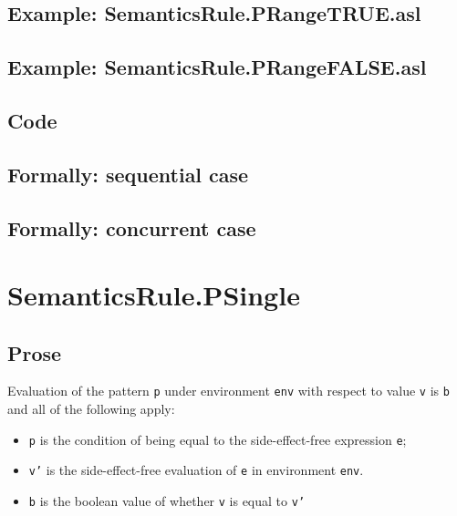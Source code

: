\documentclass{book}
\begin{document}
    \subsection{Example: SemanticsRule.PRangeTRUE.asl}

    \subsection{Example: SemanticsRule.PRangeFALSE.asl}

  \subsection{Code}

\begin{emptyformal}
  \subsection{Formally: sequential case}

  \subsection{Formally: concurrent case}
\end{emptyformal}


\section{SemanticsRule.PSingle \label{sec:SemanticsRule.PSingle}}

    \subsection{Prose}
  Evaluation of the pattern \texttt{p} under environment \texttt{env} with
  respect to value \texttt{v} is \texttt{b} and all of the following apply:
    \begin{itemize}
      \item \texttt{p} is the condition of being equal to the side-effect-free expression \texttt{e};
      \item \texttt{v'} is the side-effect-free evaluation of \texttt{e} in environment \texttt{env}.
      \item \texttt{b} is the boolean value of whether \texttt{v} is equal to \texttt{v'}
    \end{itemize}
\end{document}
